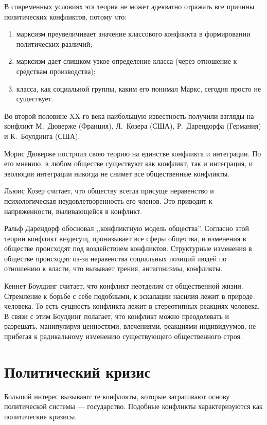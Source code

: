 \documentclass[a4paper,12pt,notitlepage,pdftex,headsepline]{scrartcl}
\begin{document}
  В современных условиях эта теория не может адекватно отражать все причины
  политических конфликтов, потому что:
  \begin{enumerate}
    \item марксизм преувеличивает значение классового конфликта в формировании
      политических различий;
    \item марксизм дает слишком узкое определение класса (через отношение к
      средствам производства);
    \item класса, как социальной группы, каким его понимал Маркс, сегодня
      просто не существует.
  \end{enumerate}

  Во второй половине XX-го века наибольшую известность получили взгляды на
  конфликт М.~Дюверже (Франция), Л.~Козера (США), Р.~Дарендорфа (Германия) и
  К.~Боулдинга (США).

  Морис Дюверже построил свою теорию на единстве конфликта и интеграции.
  По его мнению, в любом обществе существуют как конфликт, так и интеграция, и
  эволюция интеграции никогда не снимет все общественные конфликты.

  Льюис Козер считает, что обществу всегда присуще неравенство и
  психологическая неудовлетворенность его членов.
  Это приводит к напряженности, выливающейся в конфликт.

  Ральф Дарендорф обосновал ,,конфликтную модель общества''.
  Согласно этой теории конфликт вездесущ, пронизывает все сферы общества, и
  изменения в обществе происходят под воздействием конфликтов.
  Структурные изменения в обществе происходят из-за неравенства социальных
  позиций людей по отношению к власти, что вызывает трения, антагонизмы,
  конфликты.

  Кеннет Боулдинг считает, что конфликт неотделим от общественной жизни.
  Стремление к борьбе с себе подобными, к эскалации насилия лежит в природе
  человека.
  То есть сущность конфликта лежит в стереотипных реакциях человека.
  В связи с этим Боулдинг полагает, что конфликт можно преодолевать и
  разрешать, манипулируя ценностями, влечениями, реакциями индивидуумов, не
  прибегая к радикальному изменению существующего общественного строя.

  \clearpage
\section{Политический кризис}
  Большой интерес вызывают те конфликты, которые затрагивают основу
  политической системы --- государство.
  Подобные конфликты характеризуются как политические кризисы.
\end{document}
